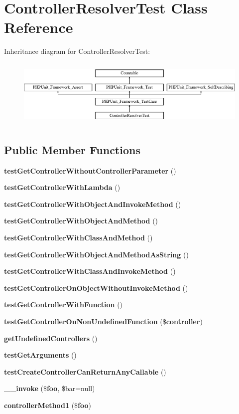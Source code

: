 \section{Controller\+Resolver\+Test Class Reference}
\label{class_symfony_1_1_component_1_1_http_kernel_1_1_tests_1_1_controller_1_1_controller_resolver_test}
Inheritance diagram for Controller\+Resolver\+Test\+:\begin{figure}[H]
\begin{center}
\leavevmode
\includegraphics[height=3.303835cm]{class_symfony_1_1_component_1_1_http_kernel_1_1_tests_1_1_controller_1_1_controller_resolver_test}
\end{center}
\end{figure}
\subsection*{Public Member Functions}
\begin{DoxyCompactItemize}
\item 
{\bf test\+Get\+Controller\+Without\+Controller\+Parameter} ()
\item 
{\bf test\+Get\+Controller\+With\+Lambda} ()
\item 
{\bf test\+Get\+Controller\+With\+Object\+And\+Invoke\+Method} ()
\item 
{\bf test\+Get\+Controller\+With\+Object\+And\+Method} ()
\item 
{\bf test\+Get\+Controller\+With\+Class\+And\+Method} ()
\item 
{\bf test\+Get\+Controller\+With\+Object\+And\+Method\+As\+String} ()
\item 
{\bf test\+Get\+Controller\+With\+Class\+And\+Invoke\+Method} ()
\item 
{\bf test\+Get\+Controller\+On\+Object\+Without\+Invoke\+Method} ()
\item 
{\bf test\+Get\+Controller\+With\+Function} ()
\item 
{\bf test\+Get\+Controller\+On\+Non\+Undefined\+Function} (\${\bf controller})
\item 
{\bf get\+Undefined\+Controllers} ()
\item 
{\bf test\+Get\+Arguments} ()
\item 
{\bf test\+Create\+Controller\+Can\+Return\+Any\+Callable} ()
\item 
{\bf \+\_\+\+\_\+invoke} (\${\bf foo}, \$bar=null)
\item 
{\bf controller\+Method1} (\${\bf foo})
\end{DoxyCompactItemize}
